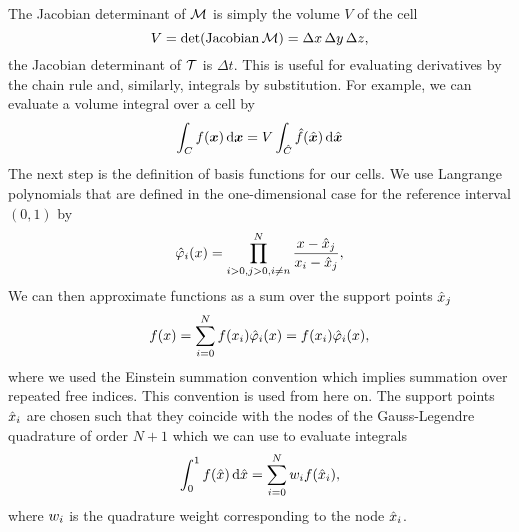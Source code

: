 The Jacobian determinant of $\mapping$ is simply the volume $V$ of the cell
\begin{equation}
  \label{eq:determinant-mapping}
  \volume = \operatorname{det}(\operatorname{Jacobian}\mapping) = \Delta x \, \Delta y \,\Delta z,
\end{equation}
the Jacobian determinant of $\timeMapping$ is $\Delta t$.
This is useful for evaluating derivatives by the chain rule and, similarly, integrals by substitution.
For example, we can evaluate a volume integral over a cell by
\begin{equation}
  \label{eq:integration-by-substitution}
  \intdcell{
f(\bm{x})
  }
  =
\volume \intdrefcell{
    \hat{f}(\hat{\bm{x}})
  }
\end{equation}
The next step is the definition of basis functions for our cells.
We use Langrange polynomials that are defined in the one-dimensional case for the reference interval $(0,1)$ by
\begin{align}
  \label{eq:lagrange-basis}
    \lagrangeRef(x) = \prod_{i >0, j>0, i \neq n}^N \frac{x - {\quadNode[j]}}{x_i - \quadNode[j]},
\end{align}
We can then approximate functions as a sum over the support points $\quadNode[j]$
\begin{equation}
  \label{eq:langrange-expansion-1d}
  f(x) = \sum_{i = 0}^N f(x_i) \lagrangeRef[i](x) = f(x_i) \lagrangeRef[i](x),
\end{equation}
where we used the Einstein summation convention which implies summation over repeated free indices.
This convention is used from here on.
The support points $\quadNode[i]$ are chosen such that they coincide with the nodes of the Gauss-Legendre quadrature of order $N+1$ which we can use to evaluate integrals
\begin{equation}
  \label{eq:quadrature-1d}
  \int_0^1 f(\hat{x}) \dd{\hat{x}} = \sum_{i=0}^{N} \quadWeight[i] f(\quadNode[i]),
\end{equation}
where $\quadWeight[i]$ is the quadrature weight corresponding to the node $\quadNode[i]$.

